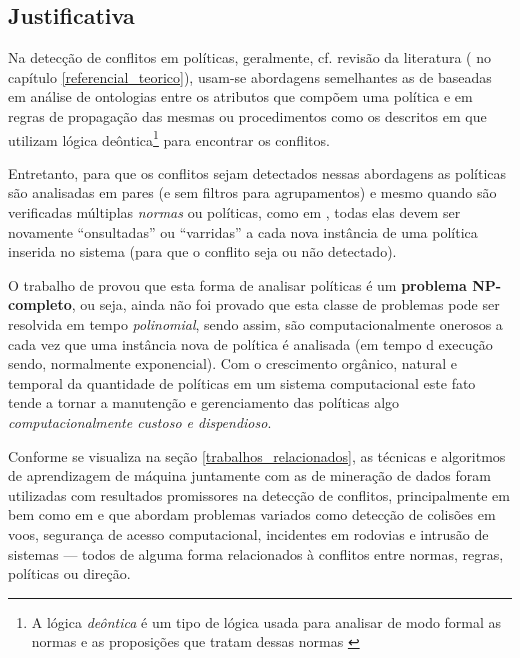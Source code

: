 \documentclass[
	12pt,				%
	openright,			%
	twoside,			%
	a4paper,			%
	english,			%
	french,				%
	spanish,			%
	brazil				%
	]{abntex2}
\begin{document}
\subsection{Justificativa}\label{justificativa}
Na detecção de conflitos em políticas, geralmente, cf. revisão da literatura ( no capítulo \ref{referencial_teorico}),  usam-se abordagens semelhantes as de  baseadas em análise de ontologias entre os atributos que compõem uma política e em regras de propagação das mesmas ou procedimentos como os descritos em  que utilizam lógica deôntica\footnote{A lógica \textit{deôntica} é um tipo de lógica usada para analisar de modo formal as normas e as proposições que tratam dessas normas \cite{eduardo2017} } para encontrar os conflitos. 

Entretanto, para que os conflitos sejam detectados nessas abordagens as políticas são analisadas em pares (e sem filtros para agrupamentos) e mesmo quando são verificadas múltiplas \textit{normas} ou políticas, como em , todas elas devem ser novamente ``onsultadas'' ou ``varridas'' a cada nova instância de uma política inserida no sistema (para que o conflito seja ou não detectado). 

O trabalho de  provou que esta forma de analisar políticas é um \textbf{problema NP-completo}, ou seja, ainda não foi provado que esta classe de problemas pode ser resolvida em tempo \textit{polinomial}, sendo assim, são computacionalmente onerosos a cada vez que uma instância nova de política é analisada (em tempo d execução sendo, normalmente exponencial). Com o crescimento orgânico, natural e temporal da quantidade de políticas em um sistema computacional este fato tende a tornar a manutenção e gerenciamento das políticas algo \textit{computacionalmente custoso e dispendioso}.   

Conforme se visualiza na seção \ref{trabalhos_relacionados}, as técnicas e algoritmos de aprendizagem de máquina juntamente com as de mineração de dados foram utilizadas com resultados promissores na detecção de conflitos, principalmente em  bem como em  e  que abordam problemas variados como detecção de colisões em voos, segurança de acesso computacional, incidentes em rodovias e intrusão de sistemas --- todos de alguma forma relacionados à conflitos entre normas, regras, políticas ou direção.  
\end{document}

